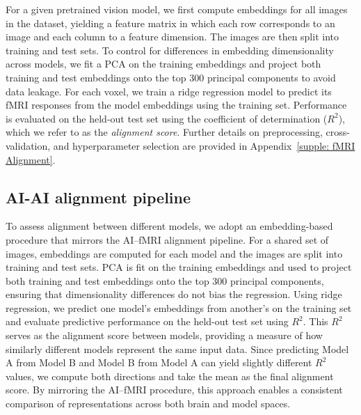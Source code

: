 \documentclass{article}
\theoremstyle{plain}
\theoremstyle{definition}
\theoremstyle{remark}
\begin{document}
For a given pretrained vision model, we first compute embeddings for all images in the dataset, yielding a feature matrix in which each row corresponds to an image and each column to a feature dimension. The images are then split into training and test sets. To control for differences in embedding dimensionality across models, we fit a PCA on the training embeddings and project both training and test embeddings onto the top 300 principal components to avoid data leakage.
For each voxel, we train a ridge regression model to predict its fMRI responses from the model embeddings using the training set. Performance is evaluated on the held-out test set using the coefficient of determination ($R^2$), which we refer to as the \emph{alignment score}. Further details on preprocessing, cross-validation, and hyperparameter selection are provided in Appendix~\ref{supple: fMRI Alignment}.


\subsection{AI-AI alignment pipeline}
\label{subsec: AI-AI alignment}

To assess alignment between different models, we adopt an embedding-based procedure that mirrors the AI--fMRI alignment pipeline. For a shared set of images, embeddings are computed for each model and the images are split into training and test sets. PCA is fit on the training embeddings and used to project both training and test embeddings onto the top 300 principal components, ensuring that dimensionality differences do not bias the regression.
Using ridge regression, we predict one model's embeddings from another's on the training set and evaluate predictive performance on the held-out test set using $R^2$. This $R^2$ serves as the alignment score between models, providing a measure of how similarly different models represent the same input data. Since predicting Model A from Model B and Model B from Model A can yield slightly different $R^2$ values, we compute both directions and take the mean as the final alignment score. By mirroring the AI--fMRI procedure, this approach enables a consistent comparison of representations across both brain and model spaces.
\end{document}
